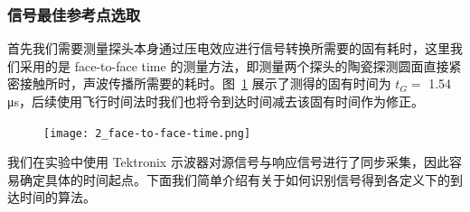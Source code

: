 \subsubsection{信号最佳参考点选取}

首先我们需要测量探头本身通过压电效应进行信号转换所需要的固有耗时，这里我们采用的是 face-to-face time 的测量方法，即测量两个探头的陶瓷探测圆面直接紧密接触所时，声波传播所需要的耗时。图~\ref{fig:face-to-face_time} 展示了测得的固有时间为 $t_{G} = $ 1.54 \unit{\micro\second}，后续使用飞行时间法时我们也将令到达时间减去该固有时间作为修正。

\begin{figure}[!htp]
  \centering
  \texttt{[image: 2\_face-to-face-time.png]}
  \label{fig:face-to-face_time}
\end{figure}

我们在实验中使用 Tektronix 示波器对源信号与响应信号进行了同步采集，因此容易确定具体的时间起点。下面我们简单介绍有关于如何识别信号得到各定义下的到达时间的算法。

